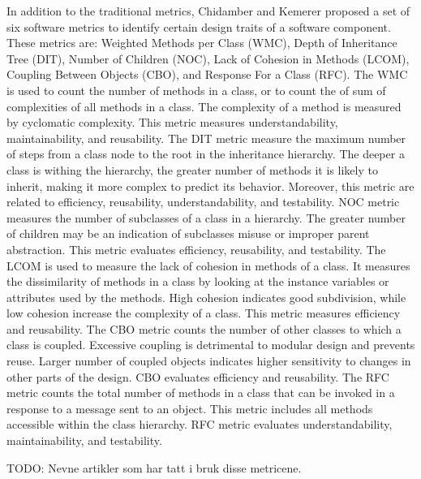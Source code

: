 In addition to the traditional metrics, Chidamber and Kemerer\cite{chidamber1994metrics} proposed a set of six software metrics to identify certain design traits of a software component. These metrics are: Weighted Methods per Class (WMC), Depth of Inheritance Tree (DIT), Number of Children (NOC), Lack of Cohesion in Methods (LCOM), Coupling Between Objects (CBO), and Response For a Class (RFC). The WMC is used to count the number of methods in a class, or to count the of sum of complexities of all methods in a class. The complexity of a method is measured by cyclomatic complexity. This metric measures understandability, maintainability, and reusability\cite{quenelobject}. The DIT metric measure the maximum number of steps from a class node to the root in the inheritance hierarchy. The deeper a class is withing the hierarchy, the greater number of methods it is likely to inherit, making it more complex to predict its behavior\cite{quenelobject}. Moreover, this metric are related to efficiency, reusability, understandability, and testability\cite{quenelobject}. NOC metric measures the number of subclasses of a class in a hierarchy. The greater number of children may be an indication of subclasses misuse or improper parent abstraction. This metric evaluates efficiency, reusability, and testability\cite{quenelobject}. The LCOM is used to measure the lack of cohesion in methods of a class. It measures the dissimilarity of methods in a class by looking at the instance variables or attributes used by the methods. High cohesion indicates good subdivision, while low cohesion increase the complexity of a class. This metric measures efficiency and reusability\cite{quenelobject}. The CBO metric counts the number of other classes to which a class is coupled. Excessive coupling is detrimental to modular design and prevents reuse\cite{quenelobject}. Larger number of coupled objects indicates higher sensitivity to changes in other parts of the design. CBO evaluates efficiency and reusability\cite{quenelobject}. The RFC metric counts the total number of methods in a class that can be invoked in a response to a message sent to an object. This metric includes all methods accessible within the class hierarchy. RFC metric evaluates understandability, maintainability, and testability\cite{quenelobject}.

TODO: Nevne artikler som har tatt i bruk disse metricene.




